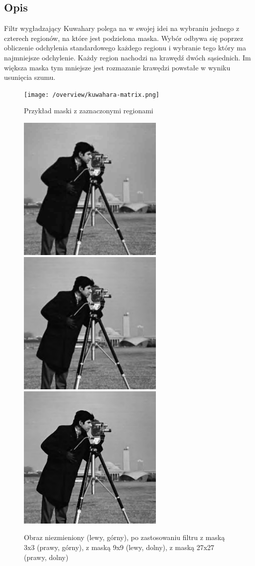 \documentclass[a4paper,12pt]{book}
\begin{document}
		\subsection{Opis}
			Filtr wygładzający Kuwahary polega na w swojej idei na wybraniu jednego z czterech regionów, na które jest podzielona maska. Wybór odbywa się poprzez obliczenie odchylenia standardowego każdego regionu i wybranie tego który ma najmniejsze odchylenie. Każdy region nachodzi na krawędź dwóch sąsiednich. Im większa maska tym mniejsze jest rozmazanie krawędzi powstałe w wyniku usunięcia szumu. 
			\begin{figure}[H]
				\caption{Przykład maski z zaznaczonymi regionami}
				\texttt{[image: /overview/kuwahara-matrix.png]}
			\end{figure}
			\begin{figure}[H]
				\caption{Obraz niezmieniony (lewy, górny), po zastosowaniu filtru z maską 3x3 (prawy, górny), z maską 9x9 (lewy, dolny), z maską 27x27 (prawy, dolny)}
				\includegraphics[width=7cm, height=7cm]{man-unmodified.jpg}
				\includegraphics[width=7cm, height=7cm]{man-filter-kuwahara3x3.png}
				\includegraphics[width=7cm, height=7cm]{man-filter-kuwahara9x9.png}

\end{figure}
\end{document}
